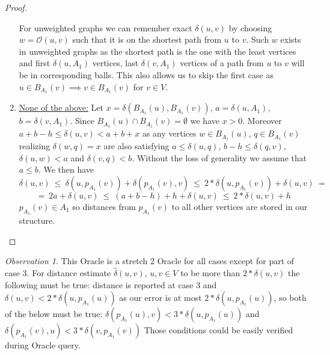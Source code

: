 \documentclass[shortabstract, lic, english]{iithesis}
\theoremstyle{definition} \newtheorem{definition}{Definition}[chapter]
\theoremstyle{remark} \newtheorem{remark}[definition]{Observation}
\theoremstyle{plain} \newtheorem{theorem}[definition]{Theorem}
\theoremstyle{plain} \newtheorem{lemma}[definition]{Lemma}
\theoremstyle{plain} \newtheorem{conjecture}[definition]{Conjecture}
\begin{document}
\begin{proof}
\begin{enumerate}
            For unweighted graphs we can remember exact $\delta(u, v)$ by choosing $w = \mathcal{O}(u,v)$ such that it is on the shortest path from $u$ to $v$.
            Such $w$ exists in unweighted graphs as the shortest path is the one with the least vertices and first $\delta(u, A_1)$ vertices, last $\delta(v, A_1)$ vertices of a path from $u$ to $v$ will be in corresponding balls.
            This also allows us to skip the first case as \newline
            $u \in B_{A_1}(v) \implies v \in B_{A_1}(v)$ for $v \in V$.
        \item \underline{None of the above:}\newline
            Let $x = \delta(B_{A_1}(u), B_{A_1}(v))$, $a = \delta(u, A_1)$, $b = \delta(v, A_1)$.
            Since $B_{A_1}(u) \cap B_{A_1}(v) = \emptyset$ we have $x > 0$.
            Moreover $a + b - h \leq \delta(u,v) < a + b + x$ as any vertices $w \in B_{A_1}(u)$, $q \in B_{A_1}(v)$ realizing
            $\delta(w, q) = x$ are also satisfying $a \leq \delta(u, q)$, $b - h \leq \delta(q, v)$, $\delta(u, w) < a$ and $\delta(v, q) < b$.
            \newline
            Without the loss of generality we assume that $a \leq b$. We then have 
            $$\delta(u, v) ~\leq~ \delta(u, p_{A_1}(v)) + \delta(p_{A_1}(v), v) ~\leq~ 2*\delta(u, p_{A_1}(v)) + \delta(u, v) ~=$$
            $$=~ 2a + \delta(u,v) ~\leq~ (a + b - h) + h + \delta(u,v) ~\leq~ 2*\delta(u, v) + h$$
            $p_{A_1}(v) \in A_1$ so distances from $p_{A_1}(v)$ to all other vertices are stored in our structure.


    \end{enumerate}
\end{proof}

\begin{remark}
    This Oracle is a stretch $2$ Oracle for all cases except for part of case 3.
    For distance estimate $\hat{\delta}(u, v)$, $u,v \in V$ to be more than $2*\delta(u,v)$
    the following must be true: distance is reported at case $3$ and $\delta(u, v) < 2*\delta(u, p_{A_1}(u))$ as our error is at most $2*\delta(u, p_{A_1}(u))$, so
    both of the below must be true:\newline
    $\delta(p_{A_1}(u), v) < 3*\delta(u, p_{A_1}(u))$ and $\delta(p_{A_1}(v), u) < 3*\delta(v, p_{A_1}(v))$
    \newline
    Those conditions could be easily verified during Oracle query.
\end{remark}
\end{document}
